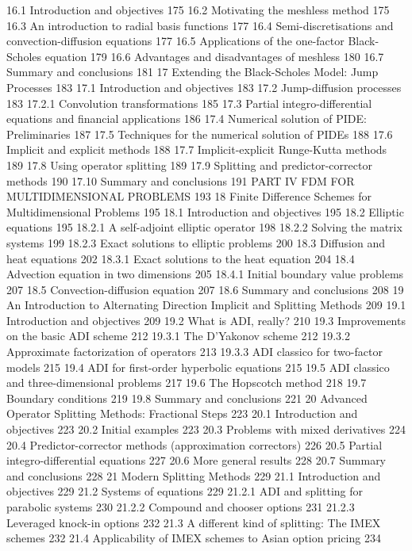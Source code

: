 16.1 Introduction and objectives 175
16.2 Motivating the meshless method 175
16.3 An introduction to radial basis functions 177
16.4 Semi-discretisations and convection-diffusion equations 177
16.5 Applications of the one-factor Black-Scholes equation 179
16.6 Advantages and disadvantages of meshless 180
16.7 Summary and conclusions 181
17 Extending the Black-Scholes Model: Jump Processes 183
17.1 Introduction and objectives 183
17.2 Jump-diffusion processes 183
17.2.1 Convolution transformations 185
17.3 Partial integro-differential equations and financial applications 186
17.4 Numerical solution of PIDE: Preliminaries 187
17.5 Techniques for the numerical solution of PIDEs 188
17.6 Implicit and explicit methods 188
17.7 Implicit-explicit Runge-Kutta methods 189
17.8 Using operator splitting 189
17.9 Splitting and predictor-corrector methods 190
17.10 Summary and conclusions 191
PART IV FDM FOR MULTIDIMENSIONAL PROBLEMS 193
18 Finite Difference Schemes for Multidimensional Problems 195
18.1 Introduction and objectives 195
18.2 Elliptic equations 195
18.2.1 A self-adjoint elliptic operator 198
18.2.2 Solving the matrix systems 199
18.2.3 Exact solutions to elliptic problems 200
18.3 Diffusion and heat equations 202
18.3.1 Exact solutions to the heat equation 204
18.4 Advection equation in two dimensions 205
18.4.1 Initial boundary value problems 207
18.5 Convection-diffusion equation 207
18.6 Summary and conclusions 208
19 An Introduction to Alternating Direction Implicit and Splitting Methods 209
19.1 Introduction and objectives 209
19.2 What is ADI, really? 210
19.3 Improvements on the basic ADI scheme 212
19.3.1 The D'Yakonov scheme 212
19.3.2 Approximate factorization of operators 213
19.3.3 ADI classico for two-factor models 215
19.4 ADI for first-order hyperbolic equations 215
19.5 ADI classico and three-dimensional problems 217
19.6 The Hopscotch method 218
19.7 Boundary conditions 219
19.8 Summary and conclusions 221
20 Advanced Operator Splitting Methods: Fractional Steps 223
20.1 Introduction and objectives 223
20.2 Initial examples 223
20.3 Problems with mixed derivatives 224
20.4 Predictor-corrector methods (approximation correctors) 226
20.5 Partial integro-differential equations 227
20.6 More general results 228
20.7 Summary and conclusions 228
21 Modern Splitting Methods 229
21.1 Introduction and objectives 229
21.2 Systems of equations 229
21.2.1 ADI and splitting for parabolic systems 230
21.2.2 Compound and chooser options 231
21.2.3 Leveraged knock-in options 232
21.3 A different kind of splitting: The IMEX schemes 232
21.4 Applicability of IMEX schemes to Asian option pricing 234
